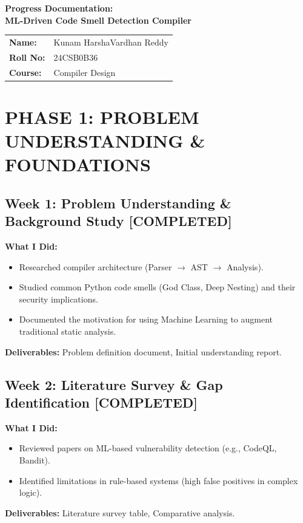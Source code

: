 \documentclass[11pt,a4paper]{article}
\newcommand{\status}[2]{\hfill \textcolor{#1}{\textbf{[#2]}}}
\begin{document}
\begin{center}
    {\LARGE \textbf{Progress Documentation:}} \\
    \vspace{5pt}
    {\Large \textbf{ML-Driven Code Smell Detection Compiler}} \\
    \vspace{10pt}
    \begin{tabular}{ll}
        \textbf{Name:} & Kunam HarshaVardhan Reddy \\
        \textbf{Roll No:} & 24CSB0B36 \\
        \textbf{Course:} & Compiler Design \\
    \end{tabular}
\end{center}

\vspace{20pt}

\section*{PHASE 1: PROBLEM UNDERSTANDING \& FOUNDATIONS}

\subsection*{Week 1: Problem Understanding \& Background Study \status{compcolor}{COMPLETED}}
\textbf{What I Did:}
\begin{itemize}[noitemsep]
    \item Researched compiler architecture (Parser $\rightarrow$ AST $\rightarrow$ Analysis).
    \item Studied common Python code smells (God Class, Deep Nesting) and their security implications.
    \item Documented the motivation for using Machine Learning to augment traditional static analysis.
\end{itemize}
\textbf{Deliverables:} Problem definition document, Initial understanding report.

\subsection*{Week 2: Literature Survey \& Gap Identification \status{compcolor}{COMPLETED}}
\textbf{What I Did:}
\begin{itemize}[noitemsep]
    \item Reviewed papers on ML-based vulnerability detection (e.g., CodeQL, Bandit).
    \item Identified limitations in rule-based systems (high false positives in complex logic).
\end{itemize}
\textbf{Deliverables:} Literature survey table, Comparative analysis.
\end{document}

